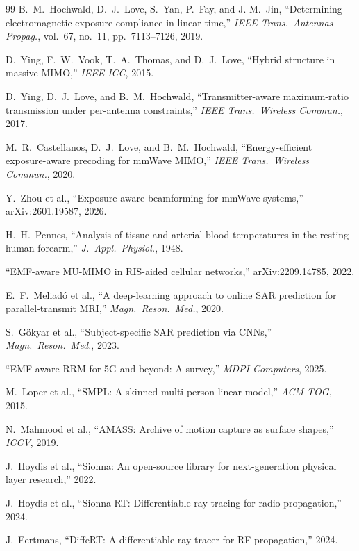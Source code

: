 \documentclass[journal,twocolumn,10pt]{IEEEtran}
\theoremstyle{definition}
\begin{document}
\begin{thebibliography}{99}
B.~M.~Hochwald, D.~J.~Love, S.~Yan, P.~Fay, and J.-M.~Jin,
``Determining electromagnetic exposure compliance in linear
time,'' \emph{IEEE Trans.\ Antennas Propag.}, vol.~67, no.~11,
pp.~7113--7126, 2019.

D.~Ying, F.~W.~Vook, T.~A.~Thomas, and D.~J.~Love,
``Hybrid structure in massive MIMO,'' \emph{IEEE ICC}, 2015.

D.~Ying, D.~J.~Love, and B.~M.~Hochwald,
``Transmitter-aware maximum-ratio transmission under per-antenna
constraints,'' \emph{IEEE Trans.\ Wireless Commun.}, 2017.

M.~R.~Castellanos, D.~J.~Love, and B.~M.~Hochwald,
``Energy-efficient exposure-aware precoding for mmWave MIMO,''
\emph{IEEE Trans.\ Wireless Commun.}, 2020.

Y.~Zhou et al., ``Exposure-aware beamforming for mmWave
systems,'' arXiv:2601.19587, 2026.

H.~H.~Pennes, ``Analysis of tissue and arterial blood
temperatures in the resting human forearm,'' \emph{J.\ Appl.\
Physiol.}, 1948.

``EMF-aware MU-MIMO in RIS-aided cellular networks,''
arXiv:2209.14785, 2022.

E.~F.~Meliad\'o et al., ``A deep-learning approach to online
SAR prediction for parallel-transmit MRI,'' \emph{Magn.\ Reson.\
Med.}, 2020.

S.~G\"okyar et al., ``Subject-specific SAR prediction via
CNNs,'' \emph{Magn.\ Reson.\ Med.}, 2023.

``EMF-aware RRM for 5G and beyond: A survey,'' \emph{MDPI
Computers}, 2025.

M.~Loper et al., ``SMPL: A skinned multi-person linear model,''
\emph{ACM TOG}, 2015.

N.~Mahmood et al., ``AMASS: Archive of motion capture as surface
shapes,'' \emph{ICCV}, 2019.

J.~Hoydis et al., ``Sionna: An open-source library for
next-generation physical layer research,'' 2022.

J.~Hoydis et al., ``Sionna RT: Differentiable ray tracing for
radio propagation,'' 2024.

J.~Eertmans, ``DiffeRT: A differentiable ray tracer for RF
propagation,'' 2024.


\end{thebibliography}
\end{document}
